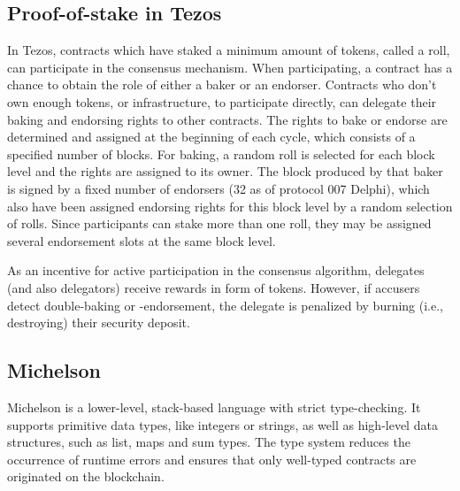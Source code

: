 \subsection{Proof-of-stake in Tezos}
In Tezos, contracts which have staked a minimum amount of tokens, called a roll, can participate in the consensus mechanism. When participating, a contract has a chance to obtain the role of either a baker or an endorser. Contracts who don't own enough tokens, or infrastructure, to participate directly, can delegate their baking and endorsing rights to other contracts. The rights to bake or endorse are determined and assigned at the beginning of each cycle, which consists of a specified number of blocks. For baking, a random roll is selected for each block level and the rights are assigned to its owner. The block produced by that baker is signed by a fixed number of endorsers (32 as of protocol 007 Delphi), which also have been assigned endorsing rights for this block level by a random selection of rolls. Since participants can stake more than one roll, they may be assigned several endorsement slots at the same block level.

As an incentive for active participation in the consensus algorithm, delegates (and also delegators) receive rewards in form of tokens. However, if accusers detect double-baking or -endorsement, the delegate is penalized by burning (i.e., destroying) their security deposit.

\subsection{Michelson}
Michelson is a lower-level, stack-based language with strict type-checking. It supports primitive data types, like integers or strings, as well as high-level data structures, such as list, maps and sum types. The type system reduces the occurrence of runtime errors and ensures that only well-typed contracts are originated on the blockchain.

